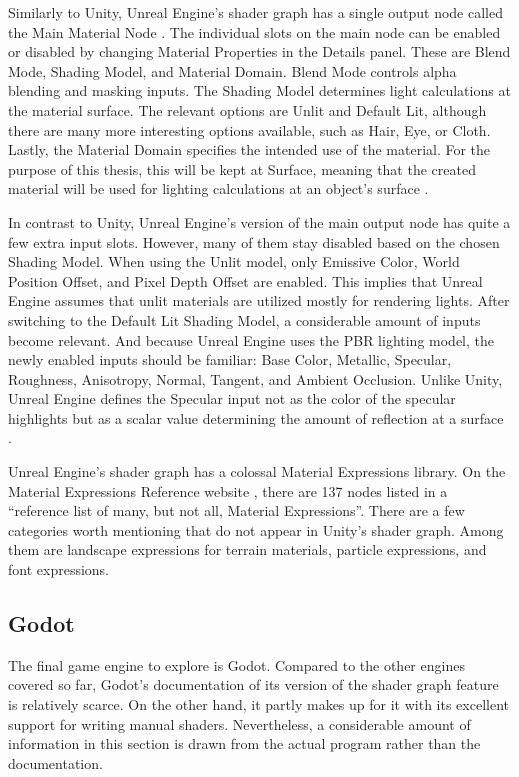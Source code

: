 \documentclass[
  digital,     %
  oneside,     %
  nosansbold,  %
  nocolorbold, %
  lof,         %
  lot,         %
]{fithesis4}
\begin{document}
Similarly to Unity, Unreal Engine's shader graph has a single output node called the Main Material Node \cite{ue-main-node}.
The individual slots on the main node can be enabled or disabled by changing Material Properties in the Details panel. These are
Blend Mode, Shading Model, and Material Domain. Blend Mode controls alpha blending and masking inputs. The Shading Model
determines light calculations at the material surface. The relevant options are Unlit and Default Lit,
although there are many more interesting options available, such as Hair, Eye, or Cloth. Lastly, the Material Domain
specifies the intended use of the material. For the purpose of this thesis, this will be kept at Surface, meaning that
the created material will be used for lighting calculations at an object's surface \cite{ue-material-inputs}.

In contrast to Unity, Unreal Engine's version of the main output node has quite a few extra input slots. However, many of them
stay disabled based on the chosen Shading Model. When using the Unlit model, only Emissive Color, World Position Offset,
and Pixel Depth Offset are enabled. This implies that Unreal Engine assumes that unlit materials are utilized mostly for rendering lights.
After switching to the Default Lit Shading Model, a considerable amount of inputs become relevant. And because Unreal Engine uses the PBR
lighting model, the newly enabled inputs should be familiar: Base Color, Metallic, Specular, Roughness, Anisotropy,
Normal, Tangent, and Ambient Occlusion. Unlike Unity, Unreal Engine defines the Specular input not as the color of the
specular highlights but as a scalar value determining the amount of reflection at a surface \cite{ue-material-inputs}.

Unreal Engine's shader graph has a colossal Material Expressions library. On the Material Expressions Reference website
\cite{ue-expr-reference}, there are 137 nodes listed in a \enquote{reference list of many, but not all, Material Expressions}.
There are a few categories worth mentioning that do not appear in Unity's shader graph. Among them are landscape expressions
for terrain materials, particle expressions, and font expressions.

\subsection{Godot}
The final game engine to explore is Godot. Compared to the other engines covered so far, Godot's documentation
of its version of the shader graph feature is relatively scarce. On the other hand, it partly makes up for it
with its excellent support for writing manual shaders. Nevertheless, a considerable amount of information in this section
is drawn from the actual program rather than the documentation.
\end{document}
